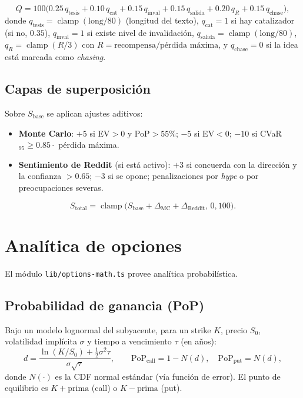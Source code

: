 \documentclass[11pt,letterpaper]{article}
\newcommand{\clp}{\operatorname{clamp}}
\begin{document}
\begin{equation}
Q = 100\big(0.25\,q_{\text{tesis}} + 0.10\,q_{\text{cat}} + 0.15\,q_{\text{inval}}
+ 0.15\,q_{\text{salida}} + 0.20\,q_{R} + 0.15\,q_{\text{chase}}\big),
\end{equation}
donde $q_{\text{tesis}} = \clp(\text{long}/80)$ (longitud del texto),
$q_{\text{cat}} = 1$ si hay catalizador (si no, $0.35$),
$q_{\text{inval}} = 1$ si existe nivel de invalidación,
$q_{\text{salida}} = \clp(\text{long}/80)$,
$q_R = \clp(R/3)$ con $R = \text{recompensa}/\text{pérdida máxima}$, y
$q_{\text{chase}} = 0$ si la idea está marcada como \emph{chasing}.

\subsection{Capas de superposición}

Sobre $S_{\text{base}}$ se aplican ajustes aditivos:

\begin{itemize}[noitemsep]
  \item \textbf{Monte Carlo}: $+5$ si EV$>0$ y PoP$>55\%$; $-5$ si EV$<0$;
        $-10$ si CVaR$_{95}\ge 0.85\cdot$ pérdida máxima.
  \item \textbf{Sentimiento de Reddit} (si está activo): $+3$ si concuerda con la
        dirección y la confianza $>0.65$; $-3$ si se opone; penalizaciones por
        \emph{hype} o por preocupaciones severas.
\end{itemize}

\begin{equation}
S_{\text{total}} = \clp\big(S_{\text{base}} + \Delta_{\text{MC}} + \Delta_{\text{Reddit}},\,0,100\big).
\end{equation}

\section{Analítica de opciones}

El módulo \texttt{lib/options-math.ts} provee analítica probabilística.

\subsection{Probabilidad de ganancia (PoP)}
Bajo un modelo lognormal del subyacente, para un strike $K$, precio $S_0$,
volatilidad implícita $\sigma$ y tiempo a vencimiento $\tau$ (en años):
\begin{equation}
d = \frac{\ln(K/S_0) + \tfrac{1}{2}\sigma^2\tau}{\sigma\sqrt{\tau}}, \qquad
\text{PoP}_{\text{call}} = 1 - N(d), \quad \text{PoP}_{\text{put}} = N(d),
\end{equation}
donde $N(\cdot)$ es la CDF normal estándar (vía función de error). El punto de
equilibrio es $K + \text{prima}$ (call) o $K - \text{prima}$ (put).
\end{document}
